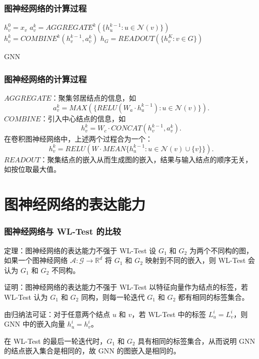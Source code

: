 \documentclass{beamer}
\begin{document}
\begin{frame}

  \frametitle{图神经网络的计算过程}
    \begin{algorithm}[H]
    \begin{algorithmic}[1]
        \STATE $h_v^0 = x_v$
      \ENDFOR
        \STATE $a_v^k = AGGREGATE^k(\{h_u^{k-1} : u \in \mathcal{N}(v)\})$
        \STATE $h_v^k = COMBINE^k(h_v^{k-1}, a_v^k)$
      \ENDFOR
      \STATE $h_G = READOUT(\{h_v^K : v \in G\})$
    \end{algorithmic}
    \caption{GNN}
    \label{alg:gnn}
    \end{algorithm}
      
\end{frame}

\begin{frame}

  \frametitle{图神经网络的计算过程}
      
  $AGGREGATE$：聚集邻居结点的信息，如 
  $$a_v^k = MAX(\{RELU(W_a \cdot h_u^{k-1}) : u \in \mathcal{N}(v)\}).$$
  $COMBINE$：引入中心结点的信息，如
  $$h_v^k = W_c \cdot CONCAT(h_v^{k-1}, a_v^k).$$
  在卷积图神经网络中，上述两个过程合为一个：
  $$h_v^k = RELU(W \cdot MEAN \{h_u^{k-1} : u \in \mathcal{N}(v) \cup \{v\} \}).$$
  $READOUT$：聚集结点的嵌入从而生成图的嵌入，结果与输入结点的顺序无关，如按位取最大值。
\end{frame}

\section{图神经网络的表达能力}

\begin{frame}

  \frametitle{图神经网络与 WL-Test 的比较}
  \begin{block}{定理：图神经网络的表达能力不强于 WL-Test}
    设 $G_1$ 和 $G_2$ 为两个不同构的图，如果一个图神经网络 $\mathcal{A}: \mathcal{G} \rightarrow \mathbb{R}^d$
    将 $G_1$ 和 $G_2$ 映射到不同的嵌入，则 WL-Test 会认为 $G_1$ 和 $G_2$ 不同构。
  \end{block}
  \begin{block}{证明：图神经网络的表达能力不强于 WL-Test}
    以特征向量作为结点的标签，若 WL-Test 认为 $G_1$ 和 $G_2$ 同构，则每一轮迭代 $G_1$ 和 $G_2$ 都有相同的标签集合。
    
    由归纳法可证：对于任意两个结点 $u$ 和 $v$，若 WL-Test 中的标签 $L_u^i = L_v^i$，则 GNN 中的嵌入向量
    $h_u^i = h_v^i$。

    在 WL-Test 的最后一轮迭代时，$G_1$ 和 $G_2$ 具有相同的标签集合，从而说明 GNN 的结点嵌入集合是相同的，故
    GNN 的图嵌入是相同的。
  \end{block}

\end{frame}
\end{document}
